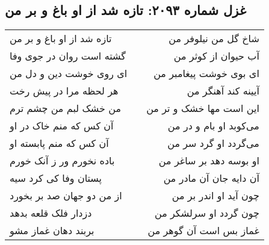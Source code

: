 \begin{center}
\section*{غزل شماره ۲۰۹۳: تازه شد از او باغ و بر من}
\label{sec:2093}
\begin{longtable}{l p{0.5cm} r}
تازه شد از او باغ و بر من
&&
شاخ گل من نیلوفر من
\\
گشته است روان در جوی وفا
&&
آب حیوان از کوثر من
\\
ای روی خوشت دین و دل من
&&
ای بوی خوشت پیغامبر من
\\
هر لحظه مرا در پیش رخت
&&
آیینه کند آهنگر من
\\
من خشک لبم من چشم ترم
&&
این است مها خشک و تر من
\\
آن کس که منم خاک در او
&&
می‌کوبد او بام و در من
\\
آن کس که منم پابسته او
&&
می‌گردد او گرد سر من
\\
باده نخورم ور ز آنک خورم
&&
او بوسه دهد بر ساغر من
\\
پستان وفا کی کرد سیه
&&
آن دایه جان آن مادر من
\\
از من دو جهان صد بر بخورد
&&
چون آید او اندر بر من
\\
دزدار فلک قلعه بدهد
&&
چون گردد او سرلشکر من
\\
بربند دهان غماز مشو
&&
غماز بس است آن گوهر من
\\
\end{longtable}
\end{center}
